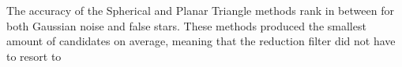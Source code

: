 The accuracy of the Spherical and Planar Triangle methods rank in between for both Gaussian noise and false stars.
These methods produced the smallest amount of candidates on average, meaning that the reduction filter did not have to
resort to 



%
%
%
